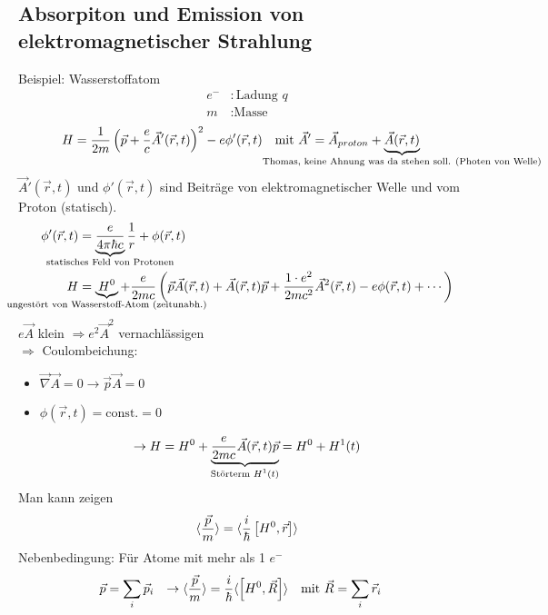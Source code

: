 \subsection{Absorpiton und Emission von elektromagnetischer Strahlung}
	Beispiel: Wasserstoffatom
		\begin{align*}
		e^- &: \text{Ladung~} q \\
		m &: \text{Masse}
		\end{align*}
		\begin{align*}
			H &= \frac{1}{2m} \left( \vec{p} + \frac{e}{c} \vec{A}' (\vec{r} , t)\right)^2
			- e \phi' (\vec{r} , t) 
			&\text{mit~} \vec{A}' &= \vec{A}_{proton} + \underbrace{\vec{A} (\vec{r} , t)}_{\mathclap{\text{Thomas, keine Ahnung was da stehen soll. (Photen von Welle)}}}		
		\end{align*}
	$\vec{A}' (\vec{r} , t)$ und $\phi' (\vec{r} , t)$ sind Beiträge von elektromagnetischer Welle und vom Proton (statisch). 
		\begin{align*}
			\phi' (\vec{r} , t) &= \underbrace{\frac{e}{4 \pi \hbar c}}_{\mathclap{\text{statisches Feld von Protonen}}}
			\frac{1}{r} + \phi (\vec{r} , t) \\
			H &= \underbrace{H^0}_{\mathclap{\text{ungestört von Wasserstoff-Atom (zeitunabh.)}}}
			+ \frac{e}{2 m c} \left( \vec{p} \vec{A} (\vec{r} , t) + \vec{A} (\vec{r} , t) \vec{p} + \frac{1 \cdot e^2}{2 m c^2} \vec{A}^2 (\vec{r} , t) - e\phi (\vec{r} , t) + \cdots 
			\right)
		\end{align*} 
	$e \vec{A}$ klein $\Rightarrow e^2 \vec{A}^2$ vernachlässigen \\
	$\Rightarrow$ Coulombeichung:
		\begin{itemize}
			\item $\vec{\nabla} \vec{A} = 0 \rightarrow \vec{p} \vec{A} = 0$ 
			\item $\phi (\vec{r}, t) = \text{const.} = 0$
		\end{itemize}
		\begin{equation*}
			\rightarrow H = H^0 +
			\underbrace{\frac{e}{2 m c} \vec{A} (\vec{r} , t) \vec{p}}_{\mathclap{\text{Störterm~} H^1(t)}} 
			= H^0 + H^1(t)
		\end{equation*}
	Man kann zeigen 
		\begin{equation*}
			\langle {\frac{\vec{p}}{m}} \rangle = \langle {\frac{i}{\hbar} \left[H^0 , \vec{r}\right]} \rangle
		\end{equation*}
	Nebenbedingung: Für Atome mit mehr als 1 $e^-$
		\begin{align*}
			\vec{p} &= \sum_i \vec{p}_i 
			&\rightarrow \langle {\frac{\vec{p}}{m}} \rangle &= \frac{i}{\hbar} \langle {\left[H^0 , \vec{R}\right]} \rangle
			&\text{mit~} \vec{R} &= \sum_i \vec{r}_i
		\end{align*}
